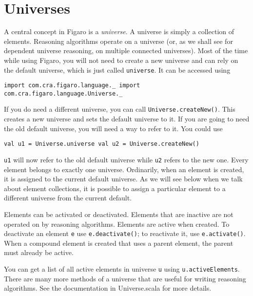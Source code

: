 \section{Universes}

A central concept in Figaro is a \emph{universe}. A universe is simply a collection of elements. Reasoning algorithms operate on a universe (or, as we shall see for dependent universe reasoning, on multiple connected universes). Most of the time while using Figaro, you will not need to create a new universe and can rely on the default universe, which is just called \texttt{universe}. It can be accessed using

\begin{flushleft}
\texttt{import com.cra.figaro.language.\_
\newline import com.cra.figaro.language.Universe.\_}
\end{flushleft}

If you do need a different universe, you can call \texttt{Universe.create\-New()}. This creates a new universe and sets the default universe to it. If you are going to need the old default universe, you will need a way to refer to it. You could use

\begin{flushleft}
\texttt{val u1 = Universe.universe
\newline val u2 = Universe.createNew()}
\end{flushleft}

\texttt{u1} will now refer to the old default universe while \texttt{u2} refers to the new one. Every element belongs to exactly one universe. Ordinarily, when an element is created, it is assigned to the current default universe. As we will see below when we talk about element collections, it is possible to assign a particular element to a different universe from the current default.

Elements can be activated or deactivated. Elements that are inactive are not operated on by reasoning algorithms. Elements are active when created. To deactivate an element \texttt{e} use \texttt{e.deactivate()}; to reactivate it, use \texttt{e.activate()}. When a compound element is created that uses a parent element, the parent must already be active.

You can get a list of all active elements in universe \texttt{u} using \texttt{u.active\-Elements}. There are many more methods of a universe that are useful for writing reasoning algorithms. See the documentation in Universe.scala for more details.

